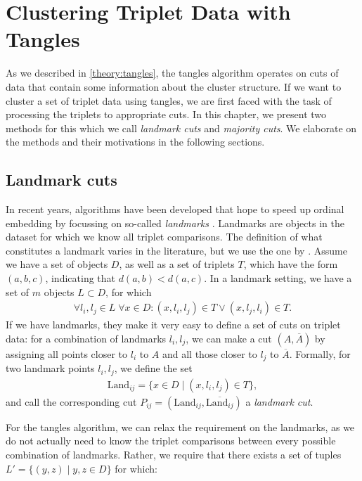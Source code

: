 \chapter{Clustering Triplet Data with Tangles}\label{methods}
As we described in \autoref{theory:tangles}, the tangles algorithm operates on cuts of data that contain some information about the cluster structure.
If we want to cluster a set of triplet data using tangles, we are first faced with the task of processing the triplets to appropriate cuts. In this chapter, we present two 
methods for this which we call \textit{landmark cuts} and \textit{majority cuts}. We elaborate on the methods and their motivations in the following sections.

\section{Landmark cuts}\label{theory:landmark_cuts}
In recent years, algorithms have been developed that hope to speed up ordinal embedding by focussing on so-called \textit{landmarks} 
\citep{ghoshLandmarkOrdinalEmbedding2019, andertonScalingOrdinalEmbedding2019}. Landmarks are objects in the dataset for which we know all triplet comparisons.  
The definition of what constitutes a landmark varies in the literature, but we use the one by \cite{haghiriComparisonBasedFrameworkPsychophysics2019}.
Assume we have a set of objects $D$, as well as a set of triplets $T$, which
have the form $(a,b,c)$, indicating that $d(a,b) < d(a,c)$. In a landmark setting, we have a set 
of $m$ objects $L \subset D$, for which 
\begin{align}
\forall l_i, l_j \in L \; \forall x \in D: (x, l_i, l_j) \in T \vee (x, l_j, l_i) \in T. 
\end{align}
If we have landmarks, they make it very easy to define a set of cuts on triplet data:
for a combination of landmarks $l_i, l_j$, we can make a cut $(A, \overline{A})$ by assigning all points closer to $l_i$ to $A$ and all those closer to $l_j$ to $\overline{A}$. 
Formally, for two landmark points $l_i, l_j$, we define the set
\begin{align}
    \text{Land} _{ij} = \{ x \in D \mid \left( x, l_i, l_j \right) \in T \}
,\end{align}
and call the corresponding cut $P_{ij} = (\text{Land}_{ij}, \overline{\text{Land}_{ij}})$ a \textit{landmark cut}.

For the tangles algorithm, we can relax the requirement on the landmarks, as we do not actually
need to know the triplet comparisons between every possible combination of landmarks. Rather, 
we require that there exists a set of tuples $L' = \{ (y, z)  \mid y, z \in D \}$ for which:

